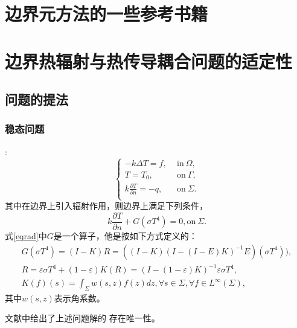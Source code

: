 \section{边界元方法的一些参考书籍}
\cite{liu2009fast,beer2008boundary,schanz2007boundary,wolf2003scaled,kerget2007domain}
\section{边界热辐射与热传导耦合问题的适定性}
\subsection{问题的提法}
\subsubsection{稳态问题}\cite{tiihonen1997stefan,tiihonen1997nonlocal}:\\
\begin{equation}
	\begin{cases}
		- k \Delta T = f,                  &\text{in} \  \Omega, \\
		T = T_0, \qquad                    &\text{on} \  \Gamma,\\
		k \frac{\partial T}{\partial n} = -q, &\text{on} \  \Sigma.\\
	\end{cases}
	\label{eq:station}
\end{equation}
其中在边界上引入辐射作用，则边界上满足下列条件，
\begin{equation}
	k\frac{\partial T}{\partial n} + G(\sigma T^4) = 0, \text{on} \ \Sigma.
	\label{eqrad}
\end{equation}
式\eqref{eqrad}中$G$是一个算子，他是按如下方式定义的：
\begin{eqnarray}
	G(\sigma T^4) = (I-K)R=((I-K)(I-(I-E)K)^{-1}E)(\sigma T^4)), \\
	R = \varepsilon\sigma T^4 + (1-\varepsilon)K(R) = (I-(1-\varepsilon)K)^{-1}\varepsilon\sigma T^4, \\
	K(f)(s) = \int_{\Sigma}w(s,z)f(z)dz, \forall s \in \Sigma, \forall f \in L^{\infty}(\Sigma),
	\label{eqoperators}
\end{eqnarray}
其中$w(s,z)$表示角系数。

文献\cite{tiihonen1997stefan,tiihonen1997nonlocal}中给出了上述问题解的
存在唯一性。


